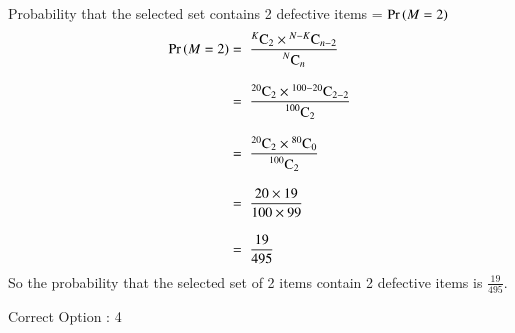 \documentclass[journal,12pt,twocolumn]{IEEEtran}
\begin{document}
Probability that the selected set contains 2 defective items = $\Pr\left(M = 2\right)$\\
\begin{align}
    \Pr\left(M = 2\right) = \hspace{0.2cm}& \frac{{}^{K}\mathrm{C}_{2} \times {}^{N-K}\mathrm{C}_{n-2}}{\displaystyle{{}^{N}\mathrm{C}_{n}}}\\[0.3cm]
               = \hspace{0.2cm}& \frac{{}^{20}\mathrm{C}_{2} \times {}^{100-20}\mathrm{C}_{2-2}}{\displaystyle{{}^{100}\mathrm{C}_{2}}}\\[0.3cm]
               = \hspace{0.2cm}& \frac{{}^{20}\mathrm{C}_{2} \times {}^{80}\mathrm{C}_{0}}{\displaystyle{{}^{100}\mathrm{C}_{2}}}\\[0.3cm]
               = \hspace{0.2cm}& \frac{20 \times 19}{100 \times 99}\\[0.3cm]
               = \hspace{0.2cm}& \frac{19}{495}
\end{align}
So the probability that the selected set of 2 items contain 2 defective items is $\displaystyle{\frac{19}{495}}$.
\begin{center}
    Correct Option : 4
\end{center}
\end{document}
